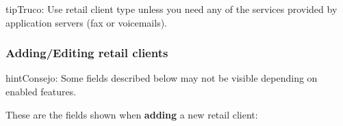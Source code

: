\documentclass[letterpaper,10pt,spanish]{sphinxmanual}
\begin{document}
\begin{notice}{tip}{Truco:}
Use retail client type unless you need any of the services provided by application servers (fax or voicemails).
\end{notice}


\subsubsection{Adding/Editing retail clients}
\label{administration_portal/brand/clients/retail:adding-editing-retail-clients}
\begin{notice}{hint}{Consejo:}
Some fields described below may not be visible depending on enabled features.
\end{notice}

These are the fields shown when \textbf{adding} a new retail client:
\end{document}
